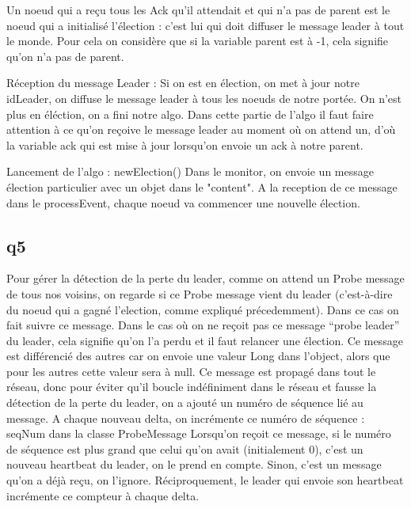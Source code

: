 \documentclass[paper=a4, fontsize=11pt]{report} %
\begin{document}
Un noeud qui a reçu tous les Ack qu'il attendait et qui n'a pas de parent est le noeud qui a initialisé l'élection : c'est lui qui doit diffuser le message leader à tout le monde. Pour cela on considère que si la variable parent est à -1, cela signifie qu'on n'a pas de parent.

Réception du message Leader :
Si on est en élection, on met à jour notre idLeader, on diffuse le message leader à tous les noeuds de notre portée. On n'est plus en éléction, on a fini notre algo.
Dans cette partie de l'algo il faut faire attention à ce qu'on reçoive le message leader au moment où on attend un, d'où la variable ack qui est mise à jour lorsqu'on envoie un ack à notre parent.


Lancement de l'algo : newElection()
Dans le monitor, on envoie un message élection particulier avec un objet dans le "content". A la reception de ce message dans le processEvent, chaque noeud va commencer une nouvelle élection.
\subsection{q5}

Pour gérer la détection de la perte du leader, comme on attend un Probe message de tous nos voisins, on regarde si ce Probe message vient du leader (c'est-à-dire du noeud qui a gagné l'election, comme expliqué précedemment).
Dans ce cas on fait suivre ce message.
Dans le cas où on ne reçoit pas ce message \enquote{probe leader} du leader, cela signifie qu'on l'a perdu et il faut relancer une élection.
Ce message est différencié des autres car on envoie une valeur Long dans l'object, alors que pour les autres cette valeur sera à null.
Ce message est propagé dans tout le réseau, donc pour éviter qu'il boucle indéfiniment dans le réseau et fausse la détection de la perte du leader, on a ajouté un numéro de séquence lié au message.
A chaque nouveau delta, on incrémente ce numéro de séquence : seqNum dans la classe ProbeMessage
Lorsqu'on reçoit ce message, si le numéro de séquence est plus grand que celui qu'on avait (initialement 0), c'est un nouveau heartbeat du leader, on le prend en compte.
Sinon, c'est un message qu'on a déjà reçu, on l'ignore. Réciproquement, le leader qui envoie son heartbeat incrémente ce compteur à chaque delta.


\end{document}
